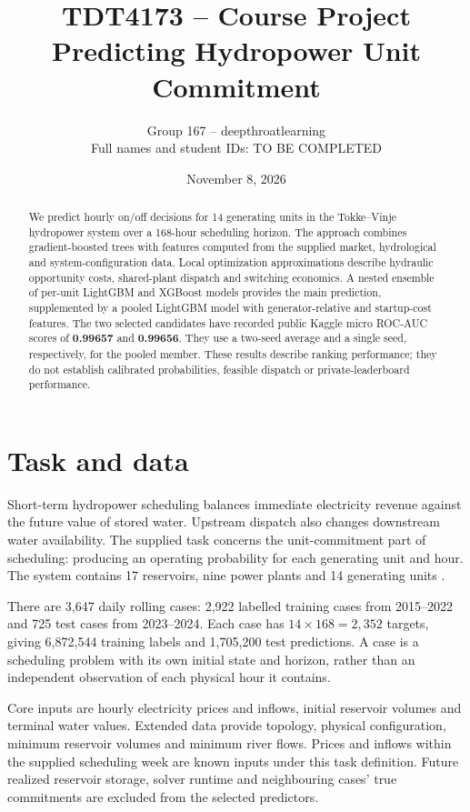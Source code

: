 \documentclass[a4paper,11pt]{article}
\title{TDT4173 -- Course Project\\[5pt]\large Predicting Hydropower Unit Commitment}
\author{Group 167 -- deepthroatlearning\\[5pt]\normalsize Full names and student IDs: TO BE COMPLETED}
\date{November 8, 2026}
\begin{document}
\maketitle

\begin{abstract}
We predict hourly on/off decisions for 14 generating units in the Tokke--Vinje hydropower system over a 168-hour scheduling horizon. The approach combines gradient-boosted trees with features computed from the supplied market, hydrological and system-configuration data. Local optimization approximations describe hydraulic opportunity costs, shared-plant dispatch and switching economics. A nested ensemble of per-unit LightGBM and XGBoost models provides the main prediction, supplemented by a pooled LightGBM model with generator-relative and startup-cost features. The two selected candidates have recorded public Kaggle micro ROC-AUC scores of \textbf{0.99657} and \textbf{0.99656}. They use a two-seed average and a single seed, respectively, for the pooled member. These results describe ranking performance; they do not establish calibrated probabilities, feasible dispatch or private-leaderboard performance.
\end{abstract}

\section{Task and data}
Short-term hydropower scheduling balances immediate electricity revenue against the future value of stored water. Upstream dispatch also changes downstream water availability. The supplied task concerns the unit-commitment part of scheduling: producing an operating probability for each generating unit and hour. The system contains 17 reservoirs, nine power plants and 14 generating units \cite{task,data}.

There are 3,647 daily rolling cases: 2,922 labelled training cases from 2015--2022 and 725 test cases from 2023--2024. Each case has $14\times168=2,352$ targets, giving 6,872,544 training labels and 1,705,200 test predictions. A case is a scheduling problem with its own initial state and horizon, rather than an independent observation of each physical hour it contains.

Core inputs are hourly electricity prices and inflows, initial reservoir volumes and terminal water values. Extended data provide topology, physical configuration, minimum reservoir volumes and minimum river flows. Prices and inflows within the supplied scheduling week are known inputs under this task definition. Future realized reservoir storage, solver runtime and neighbouring cases' true commitments are excluded from the selected predictors.
\end{document}
